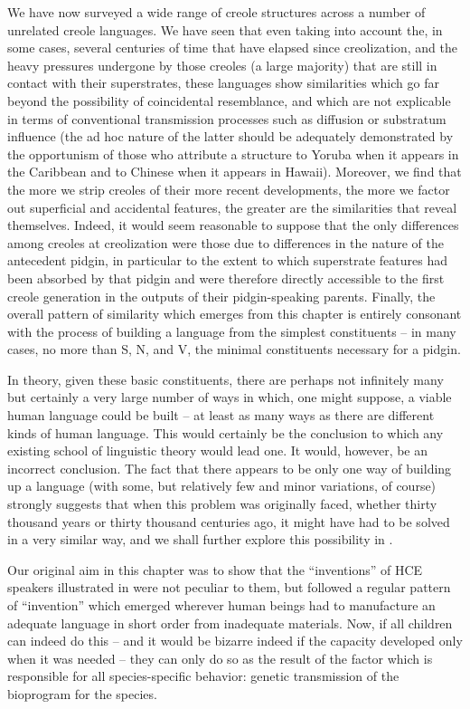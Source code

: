 We have now surveyed a wide range of creole structures across a number of unrelated creole languages. We have seen that even taking into account the, in some cases, several centuries of time that have elapsed since creolization, and the heavy pressures undergone by those creoles (a large majority) that are still in contact with their superstrates, these languages show similarities which go far beyond the possibility of coincidental resemblance, and which are not explicable in terms of conventional transmission processes such as diffusion or substratum influence (the ad hoc nature of the latter should be adequately demonstrated by the opportunism of those who attribute a structure to Yoruba when it appears in the Caribbean and to Chinese when it appears in Hawaii). Moreover, we find that the more we strip creoles of their more recent developments, the more we factor out superficial and accidental features, the greater are the similarities that reveal themselves. Indeed, it would seem reasonable to suppose that the only differences among creoles at creolization were those due to differences in the nature of the antecedent pidgin, in particular to the extent to which superstrate features had been absorbed by that pidgin and were therefore directly accessible to the first creole generation in the outputs of their pidgin-speaking parents. Finally, the overall pattern of similarity which emerges from this chapter is entirely consonant with the process of building a language from the simplest constituents -- in many cases, no more than S, N, and V, the minimal constituents necessary for a pidgin.


In theory, given these basic constituents, there are perhaps not infinitely many but certainly a very large number of ways in which, one might suppose, a viable human language could be built -- at least as many ways as there are different kinds of human language. This would certainly be the conclusion to which any existing school of linguistic theory would lead one. It would, however, be an incorrect conclusion. The fact that there appears to be only one way of building up a language (with some, but relatively few and minor variations, of course) strongly suggests that when this problem was originally faced, whether thirty thousand years or thirty thousand centuries ago, it might have had to be solved in a very similar way, and we shall further explore this possibility in .

Our original aim in this chapter was to show that the ``inventions'' of HCE speakers illustrated in  were not peculiar to them, but followed a regular pattern of ``invention'' which emerged wherever human beings had to manufacture an adequate language in short order from inadequate materials. Now, if all children can indeed do this -- and it would be bizarre indeed if the capacity developed only when it was needed -- they can only do so as the result of the factor which is responsible for all species-specific behavior: genetic transmission of the bioprogram for the species.

